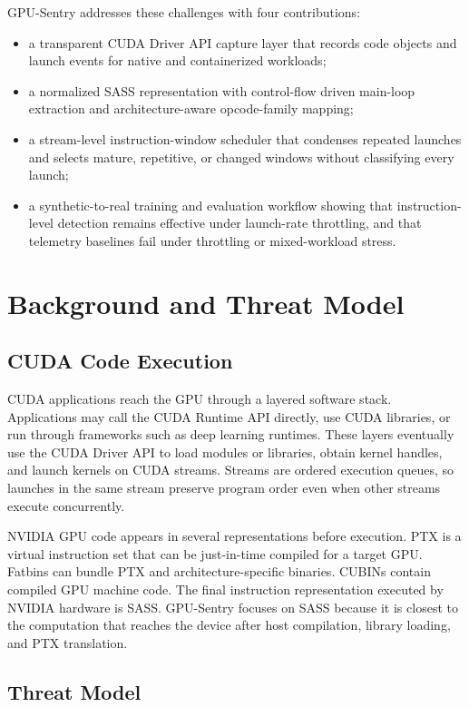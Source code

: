 GPU-Sentry addresses these challenges with four contributions:
\begin{itemize}
    \item a transparent CUDA Driver API capture layer that records code objects and launch events for native and containerized workloads;
    \item a normalized SASS representation with control-flow driven main-loop extraction and architecture-aware opcode-family mapping;
    \item a stream-level instruction-window scheduler that condenses repeated launches and selects mature, repetitive, or changed windows without classifying every launch;
    \item a synthetic-to-real training and evaluation workflow showing that instruction-level detection remains effective under launch-rate throttling, and that telemetry baselines fail under throttling or mixed-workload stress.
\end{itemize}

\section{Background and Threat Model}

\subsection{CUDA Code Execution}

CUDA applications reach the GPU through a layered software stack. Applications may call the CUDA Runtime API directly, use CUDA libraries, or run through frameworks such as deep learning runtimes. These layers eventually use the CUDA Driver API to load modules or libraries, obtain kernel handles, and launch kernels on CUDA streams. Streams are ordered execution queues, so launches in the same stream preserve program order even when other streams execute concurrently.

NVIDIA GPU code appears in several representations before execution. PTX is a virtual instruction set that can be just-in-time compiled for a target GPU. Fatbins can bundle PTX and architecture-specific binaries. CUBINs contain compiled GPU machine code. The final instruction representation executed by NVIDIA hardware is SASS. GPU-Sentry focuses on SASS because it is closest to the computation that reaches the device after host compilation, library loading, and PTX translation.

\subsection{Threat Model}

